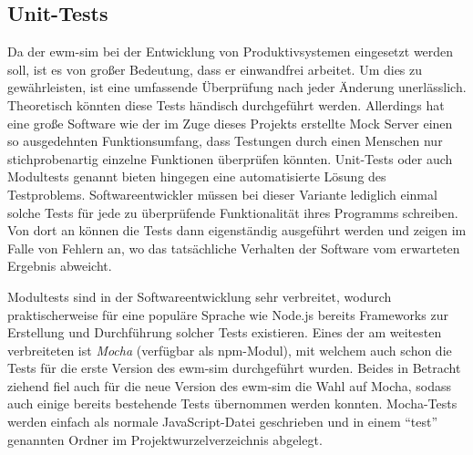 

\subsection{Unit-Tests}
Da der \ac{ewm-sim} bei der Entwicklung von Produktivsystemen eingesetzt werden soll, ist es von großer Bedeutung, dass er einwandfrei arbeitet.
Um dies zu gewährleisten, ist eine umfassende Überprüfung nach jeder Änderung unerlässlich.
Theoretisch könnten diese Tests händisch durchgeführt werden.
Allerdings hat eine große Software wie der im Zuge dieses Projekts erstellte Mock Server einen so ausgedehnten Funktionsumfang, dass Testungen durch einen Menschen nur stichprobenartig einzelne Funktionen überprüfen könnten.
Unit-Tests oder auch Modultests genannt bieten hingegen eine automatisierte Lösung des Testproblems.
Softwareentwickler müssen bei dieser Variante lediglich einmal solche Tests für jede zu überprüfende Funktionalität ihres Programms schreiben.
Von dort an können die Tests dann eigenständig ausgeführt werden und zeigen im Falle von Fehlern an, wo das tatsächliche Verhalten der Software vom erwarteten Ergebnis abweicht.

Modultests sind in der Softwareentwicklung sehr verbreitet, wodurch praktischerweise für eine populäre Sprache wie Node.js bereits Frameworks zur Erstellung und Durchführung solcher Tests existieren.
Eines der am weitesten verbreiteten ist \emph{Mocha} (verfügbar als \ac{npm}-Modul), mit welchem auch schon die Tests für die erste Version des \ac{ewm-sim} durchgeführt wurden.
Beides in Betracht ziehend fiel auch für die neue Version des \ac{ewm-sim} die Wahl auf Mocha, sodass auch einige bereits bestehende Tests übernommen werden konnten.
Mocha-Tests werden einfach als normale JavaScript-Datei geschrieben und in einem \enquote{test} genannten Ordner im Projektwurzelverzeichnis abgelegt.


